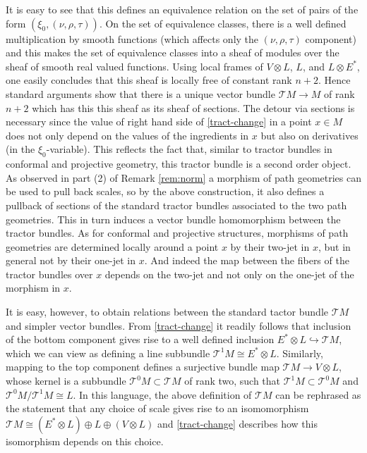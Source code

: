 \documentclass[11pt]{amsart}
\numberwithin{proposition}{section}
\numberwithin{equation}{section}
\begin{document}
It is easy to see that this defines an equivalence relation on the set of pairs of the form $(\xi_0,(\nu,\rho,\tau))$. On the set of equivalence classes, there is a well defined multiplication by smooth functions (which affects only the $(\nu,\rho,\tau)$ component) and this makes the set of equivalence classes into a sheaf of modules over the sheaf of smooth real valued functions. Using local frames of  $V\otimes L$, $L$, and $L\otimes E^*$, one easily concludes that this sheaf is locally free of constant rank $n+2$. Hence standard arguments show that there is a unique vector bundle $\mathcal{T}M\to M$ of rank $n+2$ which has this this sheaf as its sheaf  of sections. The detour via sections is necessary since the value of right hand side of \eqref{tract-change} in a point $x\in M$ does not only depend on the values of the ingredients in $x$ but also on derivatives (in the $\xi_0$-variable). This reflects the fact that, similar to tractor bundles in conformal and projective geometry, this tractor bundle is a second order object. As observed in part (2) of Remark \ref{rem:norm} a morphism of path geometries can be used to pull back scales, so by the above construction, it also defines a pullback of sections of the standard tractor bundles associated to the two path geometries. This in turn induces a vector bundle homomorphism between the tractor bundles. As for conformal and projective structures, morphisms of path geometries are determined locally around a point $x$ by their two-jet in $x$, but in general not by their one-jet in $x$. And indeed the map between the fibers of the tractor bundles over $x$ depends on the two-jet and not only on the one-jet of the morphism in $x$. 

It is easy, however, to obtain relations between the standard tactor bundle $\mathcal TM$ and simpler vector bundles. From \eqref{tract-change} it readily follows that inclusion of the bottom component gives rise to a well defined inclusion $E^*\otimes L\hookrightarrow \mathcal TM$, which we can view as defining a line subbundle $\mathcal T^1M\cong E^*\otimes L$. Similarly, mapping to the top component defines a surjective bundle map $\mathcal{T}M\to V\otimes L$, whose kernel is a subbundle $\mathcal T^0M\subset\mathcal TM$ of rank two, such that $\mathcal T^1M\subset\mathcal{T}^0M$ and $\mathcal T^0M/\mathcal T^1M\cong L$. In this language, the above definition of $\mathcal TM$ can be rephrased as the statement that any choice of scale gives rise to an isomomorphism $\mathcal{T}M\cong (E^*\otimes L)\oplus L\oplus (V\otimes L)$ and \eqref{tract-change} describes how this isomorphism depends on this choice. 
\end{document}

